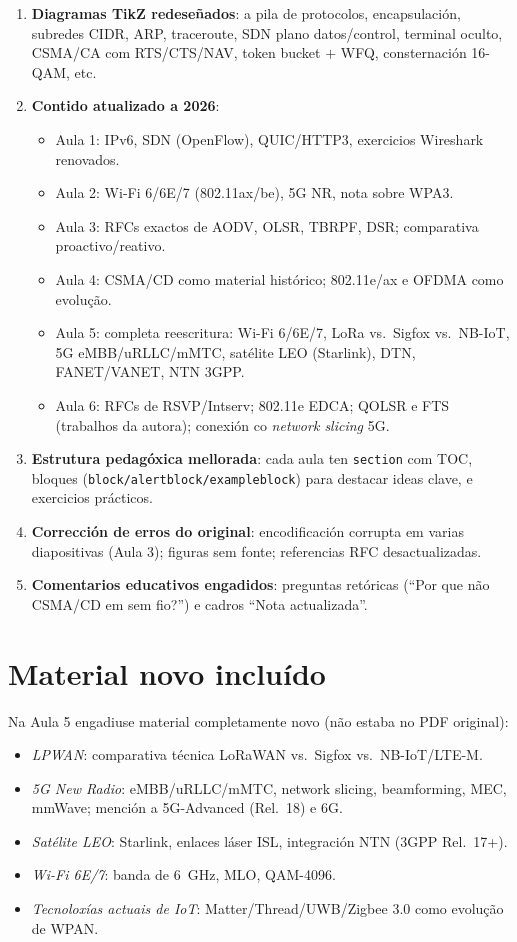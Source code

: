 \documentclass[11pt,a4paper]{article}
\begin{document}
\begin{enumerate}
  \item \textbf{Diagramas TikZ redeseñados}: a pila de protocolos, encapsulación,
        subredes CIDR, ARP, traceroute, SDN plano datos/control, terminal oculto,
        CSMA/CA com RTS/CTS/NAV, token bucket $+$ WFQ, consternación 16-QAM, etc.
  \item \textbf{Contido atualizado a 2026}:
  \begin{itemize}
    \item Aula 1: IPv6, SDN (OpenFlow), QUIC/HTTP3, exercicios Wireshark renovados.
    \item Aula 2: Wi-Fi 6/6E/7 (802.11ax/be), 5G NR, nota sobre WPA3.
    \item Aula 3: RFCs exactos de AODV, OLSR, TBRPF, DSR; comparativa proactivo/reativo.
    \item Aula 4: CSMA/CD como material histórico; 802.11e/ax e OFDMA como evolução.
    \item Aula 5: completa reescritura: Wi-Fi 6/6E/7, LoRa vs.\ Sigfox vs.\ NB-IoT,
          5G eMBB/uRLLC/mMTC, satélite LEO (Starlink), DTN, FANET/VANET, NTN 3GPP.
    \item Aula 6: RFCs de RSVP/Intserv; 802.11e EDCA; QOLSR e FTS (trabalhos da autora);
          conexión co \emph{network slicing} 5G.
  \end{itemize}
  \item \textbf{Estrutura pedagóxica mellorada}: cada aula ten \texttt{section} com
        TOC, bloques (\texttt{block/alertblock/exampleblock}) para destacar ideas
        clave, e exercicios prácticos.
  \item \textbf{Corrección de erros do original}: encodificación corrupta em varias
        diapositivas (Aula 3); figuras sem fonte; referencias RFC desactualizadas.
  \item \textbf{Comentarios educativos engadidos}: preguntas retóricas
        (``Por que não CSMA/CD em sem fio?'') e cadros ``Nota actualizada''.
\end{enumerate}

\section{Material novo incluído}

Na Aula 5 engadiuse material completamente novo (não estaba no PDF original):
\begin{itemize}
  \item \emph{LPWAN}: comparativa técnica LoRaWAN vs.\ Sigfox vs.\ NB-IoT/LTE-M.
  \item \emph{5G New Radio}: eMBB/uRLLC/mMTC, network slicing, beamforming, MEC,
        mmWave; mención a 5G-Advanced (Rel.\ 18) e 6G.
  \item \emph{Satélite LEO}: Starlink, enlaces láser ISL, integración NTN (3GPP Rel.\ 17+).
  \item \emph{Wi-Fi 6E/7}: banda de 6~GHz, MLO, QAM-4096.
  \item \emph{Tecnoloxías actuais de IoT}: Matter/Thread/UWB/Zigbee 3.0 como
        evolução de WPAN.
\end{itemize}
\end{document}
